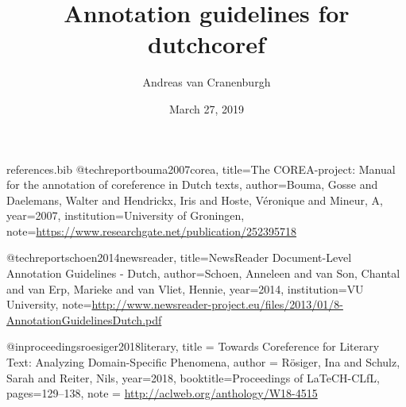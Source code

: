 \RequirePackage{filecontents}
\begin{filecontents}{references.bib}
@techreport{bouma2007corea,
  title={The {COREA}-project: {Manual} for the annotation of coreference in {Dutch} texts},
  author={Bouma, Gosse and Daelemans, Walter and Hendrickx, Iris and Hoste, V{\'e}ronique and Mineur, A},
  year={2007},
  institution={University of Groningen},
  note={\url{https://www.researchgate.net/publication/252395718}}
} %

@techreport{schoen2014newsreader,
  title={NewsReader Document-Level Annotation Guidelines - {Dutch}},
  author={Schoen, Anneleen and van Son, Chantal and van Erp, Marieke and van Vliet, Hennie},
  year={2014},
  institution={VU University},
  note={\url{http://www.newsreader-project.eu/files/2013/01/8-AnnotationGuidelinesDutch.pdf}}
}

@inproceedings{roesiger2018literary,
    title = {Towards Coreference for Literary Text: Analyzing Domain-Specific Phenomena},
    author = {R\"osiger, Ina  and Schulz, Sarah  and Reiter, Nils},
    year={2018},
    booktitle={Proceedings of LaTeCH-CLfL},
    pages={129--138},
    note = {\url{http://aclweb.org/anthology/W18-4515}}
}
\end{filecontents}
\documentclass[a4paper]{article}
\usepackage[T1]{fontenc}
\usepackage[utf8]{inputenc}
\usepackage{kpfonts, mdwlist, microtype, xcolor, natbib}
\usepackage[unicode=true]{hyperref}
\setlength{\emergencystretch}{3em}  %
\newcommand{\n}[1]{\textcolor{red}{#1}}

\title{Annotation guidelines for dutchcoref}
\author{Andreas van Cranenburgh}
\date{March 27, 2019}  %


\maketitle

\section{How to annotate?}

\begin{itemize*}
\item Read the text from start to finish, make and correct annotations as
  you go.
\item Identify mentions by asking yourself whether a span of text describes
  a specific identifiable object or person.
\item When the same entity is referred to again, ensure that both mentions
  are in the same coreference cluster. Conversely, remove any
  incorrect links.
\end{itemize*}

